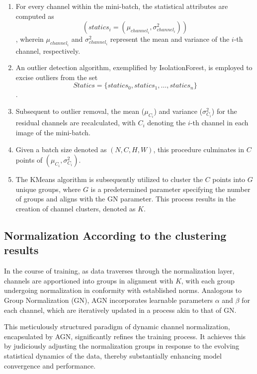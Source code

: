 \begin{enumerate}
    \item For every channel within the mini-batch, the statistical attributes are computed as \[(statics_i = (\mu_{channel_i}, \sigma^2_{channel_i}))\], wherein \(\mu_{channel_i}\) and \(\sigma^2_{channel_i}\) represent the mean and variance of the \(i\)-th channel, respectively.
    
    \item An outlier detection algorithm, exemplified by IsolationForest, is employed to excise outliers from the set \[Statics = \{ statics_0, statics_1, \ldots, statics_n \}\].

    
    \item Subsequent to outlier removal, the mean (\(\mu_{C_i}\)) and variance (\(\sigma^2_{C_i}\)) for the residual channels are recalculated, with \(C_i\) denoting the \(i\)-th channel in each image of the mini-batch.
    
    \item Given a batch size denoted as \((N, C, H, W)\), this procedure culminates in \(C\) points of \((\mu_{C_i}, \sigma^2_{C_i})\).
    
    \item The KMeans algorithm is subsequently utilized to cluster the \(C\) points into \(G\) unique groups, where \(G\) is a predetermined parameter specifying the number of groups and aligns with the GN parameter. This process results in the creation of channel clusters, denoted as \(K\).
\end{enumerate}

\subsection{Normalization According to the clustering results}
In the course of training, as data traverses through the normalization layer, channels are apportioned into groups in alignment with \(K\), with each group undergoing normalization in conformity with established norms. Analogous to Group Normalization (GN), AGN incorporates learnable parameters \(\alpha\) and \(\beta\) for each channel, which are iteratively updated in a process akin to that of GN.

This meticulously structured paradigm of dynamic channel normalization, encapsulated by AGN, significantly refines the training process. It achieves this by judiciously adjusting the normalization groups in response to the evolving statistical dynamics of the data, thereby substantially enhancing model convergence and performance.


